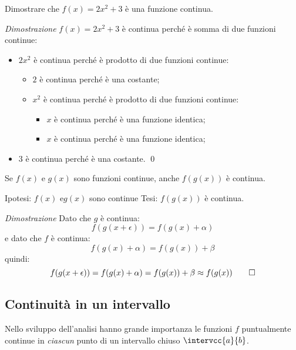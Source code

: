 \begin{esempio}
 Dimostrare che \(f(x)=2x^2 + 3\) è una funzione continua.

\emph{Dimostrazione}
\(f(x)=2x^2 + 3\) è continua perché è somma di due funzioni continue: 
 \begin{itemize}[nosep]
  \item \(2x^2\) è continua perché è prodotto di due funzioni continue:
  \begin{itemize}[nosep]
   \item \(2\) è continua perché è una costante;
   \item \(x^2\) è continua perché è prodotto di due funzioni continue:
   \begin{itemize}[nosep]
    \item \(x\) è continua perché è una funzione identica;
    \item \(x\) è continua perché è una funzione identica;
   \end{itemize}
  \end{itemize}
  \item \(3\) è continua perché è una costante. \qed
 \end{itemize}


\end{esempio}

\begin{teorema}
Se \(f(x)\) e \(g(x)\) sono funzioni continue, anche \(f(g(x))\) è continua.
\end{teorema}

\noindent Ipotesi: 
\(f(x) \text{ e} g(x)\) sono continue
\tab Tesi: 
\(f(g(x))\) è continua.

\emph{Dimostrazione}
Dato che \(g\) è continua: 
\[f(g(x+\epsilon)) = f(g(x)+\alpha)\]
e dato che \(f\) è continua: 
\[f(g(x)+\alpha)=f(g(x))+\beta\]
quindi: 
\[f(g(x+\epsilon)) = f(g(x)+\alpha) = f(g(x))+\beta \approx f(g(x)) \qed\]

\subsection{Continuità in un intervallo}
\label{subsec:cont_definizione}

Nello sviluppo dell'analisi hanno grande importanza le funzioni 
\(f\) puntualmente continue in \emph{ciascun} punto di un intervallo chiuso 
\(\intervcc{a}{b}\).

